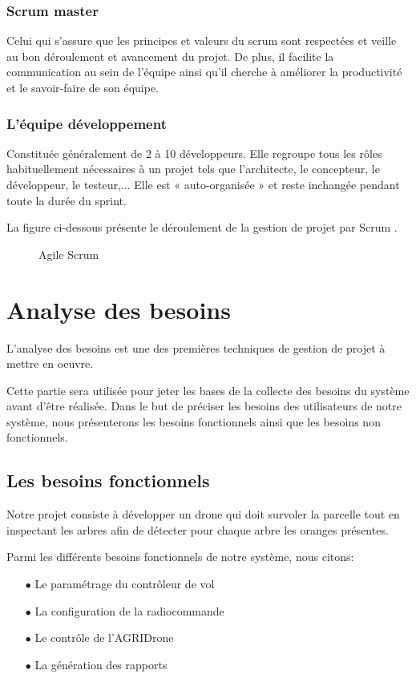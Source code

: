 \subsubsection{Scrum master  }
Celui qui s’assure que les principes et valeurs du scrum sont
respectées et veille au bon déroulement et avancement du projet. De plus, il facilite la communication au sein de l’équipe ainsi qu'il cherche à améliorer la productivité et le savoir-faire de son équipe.
\subsubsection{L'équipe développement  }
Constituée généralement de 2 à 10 développeurs. Elle regroupe tous les rôles habituellement nécessaires à un projet tels que l'architecte, le concepteur, le développeur, le testeur,... Elle est « auto-organisée » et reste inchangée pendant toute la durée du sprint.

La figure ci-dessous présente le déroulement de la gestion de projet par Scrum \cite{Crochet}.

\begin{figure} [H]
	\begin{center}
		\centering
		\vskip 1.5cm
		\hspace*{-0.5cm}
	\end{center}
	\caption{Agile Scrum}
\end{figure}
\clearpage
\section{Analyse des besoins }	
L'analyse des besoins est une des premières techniques de gestion de projet à mettre en oeuvre.

Cette partie sera utilisée pour jeter les bases de la collecte des besoins du système avant d'être réalisée.
Dans le but de préciser les besoins des utilisateurs de notre système, nous présenterons les besoins fonctionnels ainsi que les besoins non fonctionnels.

\subsection{Les besoins fonctionnels}
Notre projet consiste à développer un drone qui doit survoler la parcelle tout en inspectant les arbres afin de détecter pour chaque arbre les oranges présentes.

Parmi les différents besoins fonctionnels de notre système, nous citons:
\begin{itemize}
	\item [$\bullet$] Le paramétrage du contrôleur de vol 
	\item [$\bullet$]La configuration de la radiocommande 
	\item [$\bullet$]Le contrôle de l'AGRIDrone
	\item[$\bullet$] La génération des rapports
\end{itemize} 

